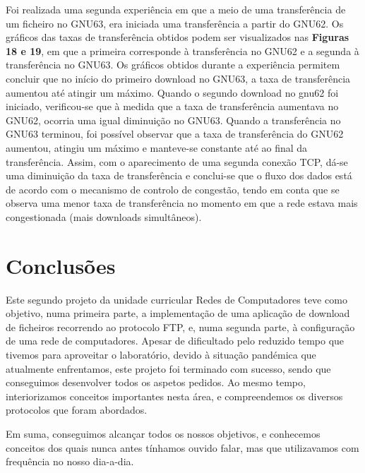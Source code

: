 \documentclass[article, a4paper, 11pt, oneside]{memoir}
\begin{document}
Foi realizada uma segunda experiência em que a meio de uma transferência de um ficheiro no GNU63, 
era iniciada uma transferência a partir do GNU62. Os gráficos das taxas de transferência
obtidos podem ser visualizados nas \textbf{Figuras 18 e 19}, em que a primeira corresponde à transferência no GNU62 e a segunda à transferência no GNU63.
Os gráficos obtidos durante a experiência permitem concluir que no início do primeiro download no GNU63, a taxa de transferência aumentou até atingir um máximo. 
Quando o segundo download no gnu62 foi iniciado, verificou-se que à medida que a taxa de transferência aumentava no GNU62, ocorria uma igual diminuição no GNU63. 
Quando a transferência no GNU63
terminou, foi possível observar que a taxa de transferência do GNU62 aumentou, atingiu um máximo e manteve-se constante até ao final da transferência.
Assim, com o aparecimento de uma segunda conexão TCP, dá-se uma diminuição da taxa de transferência e conclui-se que o fluxo dos dados está de acordo 
com o mecanismo de controlo de congestão, tendo em conta que se observa uma menor taxa de transferência no momento em que a rede estava mais congestionada 
(mais downloads simultâneos).



\chapter[Conclusões][Conclusões]{Conclusões} \label{\thechapter}

Este segundo projeto da unidade curricular Redes de Computadores teve como objetivo, numa primeira parte, a implementação de uma aplicação de download de ficheiros recorrendo ao protocolo FTP,
e, numa segunda parte, à configuração de uma rede de computadores. Apesar de dificultado pelo reduzido tempo que tivemos para aproveitar o laboratório, devido à situação pandémica que atualmente enfrentamos,
este projeto foi terminado com sucesso, sendo que conseguimos desenvolver todos os aspetos pedidos.
Ao mesmo tempo, interiorizamos conceitos importantes nesta área, e compreendemos os diversos protocolos que foram abordados.

Em suma, conseguimos alcançar todos os nossos objetivos, e conhecemos conceitos dos quais nunca antes tínhamos ouvido falar, mas que utilizavamos com frequência no nosso dia-a-dia.
\end{document}
